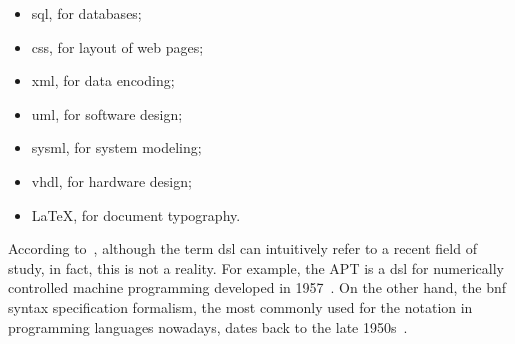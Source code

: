 \begin{itemize}
     \item \ac{sql}, for databases;
     \item \ac{css}, for layout of web pages;
     \item \ac{xml}, for data encoding;
     \item \ac{uml}, for software design;
     \item \ac{sysml}, for system modeling;
     \item \ac{vhdl}, for hardware design;
     \item \LaTeX, for document typography.
\end{itemize}

According to~\cite{Faveri:2013}, although the term \ac{dsl} can intuitively refer to a recent field of study, in fact, this is not a reality.
For example, the APT is a \ac{dsl} for numerically controlled machine programming developed in 1957~\cite{Ross:1978}. 
On the other hand, the \ac{bnf} syntax specification formalism, the most commonly used for the notation in programming languages nowadays, dates back to the late 1950s~\cite{Backus:1959}.
    

